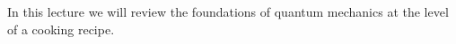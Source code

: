 In this lecture we will review the foundations of quantum mechanics at the level of a cooking recipe. 